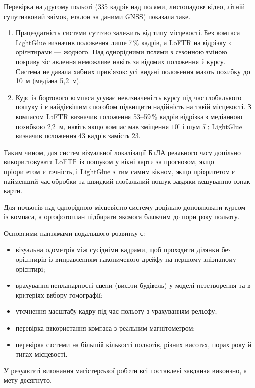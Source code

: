 \documentclass[a4paper, 12pt, titlepage]{article}
\begin{document}
Перевірка на другому польоті (335 кадрів над полями, листопадове відео, літній супутниковий знімок, еталон за даними GNSS) показала таке.
\begin{enumerate}[resume]
    \item Працездатність системи суттєво залежить від типу місцевості. Без компаса LightGlue визначив положення лише 7\,\% кадрів, а LoFTR на відрізку з орієнтирами --- жодного. Над однорідними полями з сезонною зміною покриву зіставлення неможливе навіть за відомих положення й курсу. Система не давала хибних прив'язок: усі видані положення мають похибку до 10~м (медіана 5,2~м).
    \item Курс із бортового компаса усуває невизначеність курсу під час глобального пошуку і є найдієвішим способом підвищити надійність на такій місцевості. З компасом LoFTR визначив положення 53--59\,\% кадрів відрізка з медіанною похибкою 2,2~м, навіть якщо компас мав зміщення $10^\circ$ і шум $5^\circ$; LightGlue визначив положення 43 кадрів замість 23.
\end{enumerate}

Таким чином, для систем візуальної локалізації БпЛА реального часу доцільно використовувати LoFTR із пошуком у вікні карти за прогнозом, якщо пріоритетом є точність, і LightGlue з тим самим вікном, якщо пріоритетом є найменший час обробки та швидкий глобальний пошук завдяки кешуванню ознак карти.

Для польотів над однорідною місцевістю систему доцільно доповнювати курсом із компаса, а ортофотоплан підбирати якомога ближчим до пори року польоту.

Основними напрямами подальшого розвитку є:
\begin{itemize}
    \item візуальна одометрія між сусідніми кадрами, щоб проходити ділянки без орієнтирів із виправленням накопиченого дрейфу на першому впізнаному орієнтирі;
    \item врахування непланарності сцени (висоти будівель) у моделі перетворення та в критеріях вибору гомографії;
    \item уточнення масштабу кадру під час польоту з урахуванням рельєфу;
    \item перевірка використання компаса з реальним магнітометром;
    \item перевірка системи на більшій кількості польотів, різних висотах, порах року й типах місцевості.
\end{itemize}

У результаті виконання магістерської роботи всі поставлені завдання виконано, а мету досягнуто.
\end{document}
